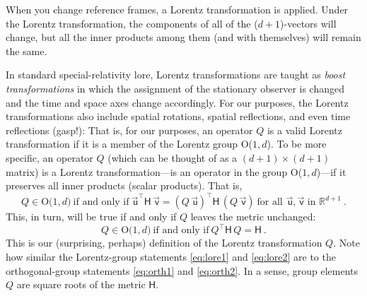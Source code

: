 \documentclass{article}
\newcommand{\metric}{\mathsf{H}}
\newcommand\upvec[1]{\!\vec{\,\mathrm{#1}}}
\newcommand{\Lvec}[1]{\upvec{\mathsf{#1}}} %
\newcommand{\plus}{\!+\!} %
\begin{document}
When you change reference frames, a Lorentz transformation is applied.
Under the Lorentz transformation, the components of all of the ($d\plus1$)-vectors will change, but all the inner products among them (and with themselves) will remain the same.

In standard special-relativity lore, Lorentz transformations are taught as \emph{boost transformations} in which the assignment of the stationary observer is changed and the time and space axes change accordingly.
For our purposes, the Lorentz transformations also include spatial rotations, spatial reflections, and even time reflections (gasp!):
That is, for our purposes, an operator $Q$ is a valid Lorentz transformation if it is a member of the Lorentz group O($1,d$).
To be more specific, an operator $Q$ (which can be thought of as a $(d+1)\times(d+1)$ matrix) is a Lorentz transformation---is an operator in the group O($1,d$)---if it preserves all inner products (scalar products). 
That is,
\begin{equation}
    Q \in \mbox{O($1,d$)} ~ \mbox{if and only if} ~ \Lvec{u}^\top\metric\,\Lvec{v}=(Q\,\Lvec{u})^\top\metric\,(Q\,\Lvec{v}) ~ \mbox{for all $\Lvec{u},\Lvec{v}$ in $\mathbb{R}^{d+1}$} ~.\label{eq:lore1}
\end{equation}
This, in turn, will be true if and only if $Q$ leaves the metric unchanged:
\begin{equation}
    Q \in \mbox{O($1,d$)} ~ \mbox{if and only if} ~ Q^\top\metric\,Q=\metric ~.\label{eq:lore2}
\end{equation}
This is our (surprising, perhaps) definition of the Lorentz transformation $Q$.
Note how similar the Lorentz-group statements \eqref{eq:lore1} and \eqref{eq:lore2} are to the orthogonal-group statements \eqref{eq:orth1} and \eqref{eq:orth2}.
In a sense, group elements $Q$ are square roots of the metric $\metric$.
\end{document}
